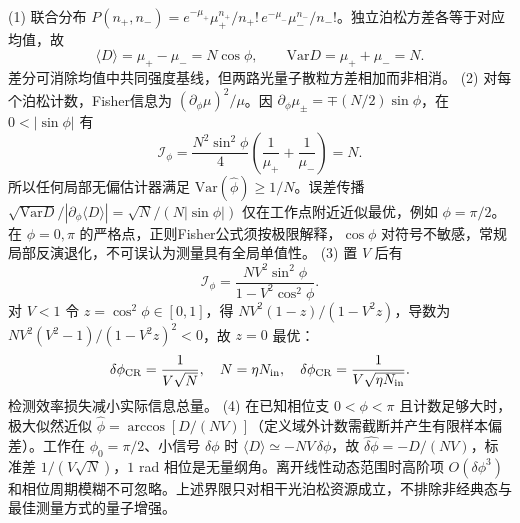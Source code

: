 (1) 联合分布 \(P(n_+,n_-)=e^{-\mu_+}\mu_+^{n_+}/n_+!\,e^{-\mu_-}\mu_-^{n_-}/n_-!\)。独立泊松方差各等于对应均值，故
\[
\langle D\rangle=\mu_+-\mu_-=N\cos\phi,\qquad
\mathrm{Var}D=\mu_++\mu_-=N.
\]
差分可消除均值中共同强度基线，但两路光量子散粒方差相加而非相消。
(2) 对每个泊松计数，Fisher信息为 \((\partial_\phi\mu)^2/\mu\)。因 \(\partial_\phi\mu_\pm=\mp(N/2)\sin\phi\)，在 \(0<|\sin\phi|\) 有
\[
\mathcal I_\phi=\frac{N^2\sin^2\phi}{4}\!\left(\frac1{\mu_+}+\frac1{\mu_-}\right)=N.
\]
所以任何局部无偏估计器满足 \(\mathrm{Var}(\hat\phi)\ge1/N\)。误差传播 \(\sqrt{\mathrm{Var}D}/|\partial_\phi\langle D\rangle|=\sqrt N/(N|\sin\phi|)\) 仅在工作点附近近似最优，例如 \(\phi=\pi/2\)。在 \(\phi=0,\pi\) 的严格点，正则Fisher公式须按极限解释，\(\cos\phi\) 对符号不敏感，常规局部反演退化，不可误认为测量具有全局单值性。
(3) 置 \(V\) 后有
\[
\mathcal I_\phi=
\frac{NV^2\sin^2\phi}{1-V^2\cos^2\phi}.
\]
对 \(V<1\) 令 \(z=\cos^2\phi\in[0,1]\)，得 \(NV^2(1-z)/(1-V^2z)\)，导数为 \(NV^2(V^2-1)/(1-V^2z)^2<0\)，故 \(z=0\) 最优：
\[
\delta\phi_{\rm CR}=\frac1{V\sqrt N},\quad
N=\eta N_{\rm in},\quad
\delta\phi_{\rm CR}=\frac1{V\sqrt{\eta N_{\rm in}}}.
\]
检测效率损失减小实际信息总量。
(4) 在已知相位支 \(0<\phi<\pi\) 且计数足够大时，极大似然近似 \(\hat\phi=\arccos[D/(N V)]\)（定义域外计数需截断并产生有限样本偏差）。工作在 \(\phi_0=\pi/2\)、小信号 \(\delta\phi\) 时
\(\langle D\rangle\simeq-NV\,\delta\phi\)，故 \(\hat{\delta\phi}=-D/(NV)\)，标准差 \(1/(V\sqrt N)\)，\(1\) rad 相位是无量纲角。离开线性动态范围时高阶项 \(O(\delta\phi^3)\) 和相位周期模糊不可忽略。上述界限只对相干光泊松资源成立，不排除非经典态与最佳测量方式的量子增强。
